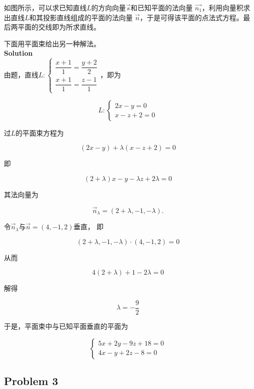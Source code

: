 \documentclass[12pt, a4paper]{article}
\numberwithin{equation}{section}
\begin{document}
    如图所示，可以求已知直线\(L\)的方向向量\(\overrightarrow{s}\)和已知平面的法向量
    \(\overrightarrow{n_1}\)，利用向量积求出直线\(L\)和其投影直线组成的平面的法向量
    \(\overrightarrow{n}\)，于是可得该平面的点法式方程。最后两平面的交线即为所求直线。

    下面用平面束给出另一种解法。
    \\

    \textbf{Solution}
    \\

    由题，直线\(L: \left\{\begin{array}{l}\dfrac{x+1}{1}=\dfrac{y+2}{2} \\
    \dfrac{x+1}{1}=\dfrac{z-1}{1}\end{array}\right.\)，即为

    $$
        L:\left\{\begin{array}{l}
        2 x-y=0 \\
        x-z+2=0
        \end{array}\right.
    $$

    过\(L\)的平面束方程为

    \[
        \left(2x-y\right) + \lambda \left(x-z+2\right) = 0
    \]

    即

    \[
        (2+\lambda) x-y-\lambda z+2 \lambda=0
    \]

    其法向量为

    $$
        \overrightarrow{n}_\lambda=(2+\lambda,-1,-\lambda) .
    $$

    令\(\overrightarrow{n}_\lambda\)与\(\overrightarrow{n} = \left(4,-1,2\right)\)垂直，
    即

    $$
        (2+\lambda,-1,-\lambda) \cdot(4,-1,2)=0
    $$

    从而

    $$
        4(2+\lambda)+1-2 \lambda=0
    $$

    解得

    \[
        \lambda = -\frac{9}{2}
    \]

    于是，平面束中与已知平面垂直的平面为

    $$
        \left\{\begin{array}{l}
        5 x+2y-9 z+18=0 \\
        4 x-y+2 z-8=0
        \end{array}\right.
    $$

\subsection{Problem 3}
\end{document}
